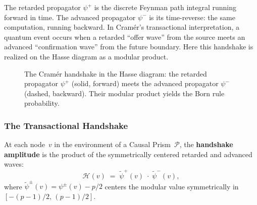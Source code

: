 \documentclass[11pt, a4paper, openany]{book}
\begin{document}
\noindent
The retarded propagator $\psi^+$ is the discrete Feynman path
integral running forward in time.  The advanced propagator $\psi^-$ is
its time-reverse: the same computation, running backward.  In
Cram\'er's transactional interpretation, a quantum event occurs when
a retarded ``offer wave'' from the source meets an advanced
``confirmation wave'' from the future boundary.  Here this handshake
is realized on the Hasse diagram as a modular product.

\begin{figure}[ht]
\centering
{}
\caption{The Cram\'er handshake in the Hasse diagram: the retarded propagator
$\psi^+$ (solid, forward) meets the advanced propagator $\psi^-$ (dashed,
backward).  Their modular product yields the Born rule probability.}
\label{fig:cramer-handshake}
\end{figure}

\subsubsection{The Transactional Handshake}

\begin{definition}
\label{def:handshake}
At each node~$v$ in the environment of a Causal
Prism~$\mathcal{P}$, the \textbf{handshake amplitude} is the
product of the symmetrically centered retarded and advanced waves:
\[
  \mathcal{H}(v) \;=\;
  \widetilde{\psi}^{+}(v) \;\cdot\;
  \widetilde{\psi}^{-}(v),
\]
where $\widetilde{\psi}^{\pm}(v) = \psi^{\pm}(v) - p/2$
centers the modular value symmetrically in
$[-(p-1)/2,\, (p-1)/2]$.
\end{definition}
\end{document}
